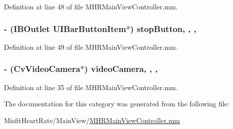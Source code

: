 Definition at line 48 of file M\+H\+R\+Main\+View\+Controller.\+mm.

\hypertarget{category_m_h_r_main_view_controller_07_08_a0e349ec3fa2cecae6592c8d9489dedfe}{
\subsubsection[{stop\+Button}]{\setlength{\rightskip}{0pt plus 5cm}-\/ (I\+B\+Outlet U\+I\+Bar\+Button\+Item$\ast$) stop\+Button\hspace{0.3cm}{\ttfamily [read]}, {\ttfamily [write]}, {\ttfamily [nonatomic]}, {\ttfamily [strong]}}}\label{category_m_h_r_main_view_controller_07_08_a0e349ec3fa2cecae6592c8d9489dedfe}


Definition at line 49 of file M\+H\+R\+Main\+View\+Controller.\+mm.

\hypertarget{category_m_h_r_main_view_controller_07_08_a82652cbbdc0ac312a50c591870b579c1}{
\subsubsection[{video\+Camera}]{\setlength{\rightskip}{0pt plus 5cm}-\/ (Cv\+Video\+Camera$\ast$) video\+Camera\hspace{0.3cm}{\ttfamily [read]}, {\ttfamily [write]}, {\ttfamily [nonatomic]}, {\ttfamily [retain]}}}\label{category_m_h_r_main_view_controller_07_08_a82652cbbdc0ac312a50c591870b579c1}


Definition at line 35 of file M\+H\+R\+Main\+View\+Controller.\+mm.



The documentation for this category was generated from the following file\+:\begin{DoxyCompactItemize}
\item 
Misfit\+Heart\+Rate/\+Main\+View/\hyperlink{_m_h_r_main_view_controller_8mm}{M\+H\+R\+Main\+View\+Controller.\+mm}\end{DoxyCompactItemize}
